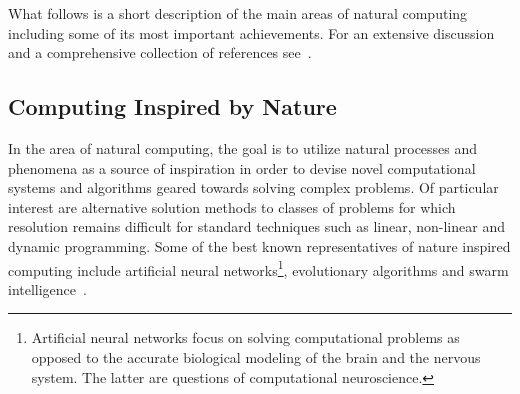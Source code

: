 	What follows is a short description of the main areas of natural computing including some of its most important achievements. For an extensive discussion and a comprehensive collection of references see~\cite{de2007fundamentals}.

	\FloatBarrier

	\subsection{Computing Inspired by Nature}

		In the area of natural computing, the goal is to utilize natural processes and phenomena as a source of inspiration in order to devise novel computational systems and algorithms geared towards solving complex problems. Of particular interest are alternative solution methods to classes of problems for which resolution remains difficult for standard techniques such as linear, non-linear and dynamic programming. Some of the best known representatives of nature inspired computing include artificial neural networks\footnote{Artificial neural networks focus on solving computational problems as opposed to the accurate biological modeling of the brain and the nervous system. The latter are questions of computational neuroscience.}, evolutionary algorithms and swarm intelligence~\cite{de2007fundamentals}.

